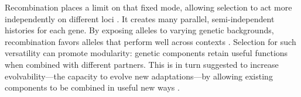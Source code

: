 \documentclass[11pt]{article}
\begin{document}
Recombination places a limit on that fixed mode, allowing selection to act more independently on different loci \citep{felsenstein1974evolutionary}. It creates many parallel, semi-independent histories for each gene. By exposing alleles to varying genetic backgrounds, recombination favors alleles that perform well across contexts \citep{livnat2008mixability,livnat2010sex}. Selection for such versatility can promote modularity: genetic components retain useful functions when combined with different partners. This is in turn suggested to increase evolvability---the capacity to evolve new adaptations---by allowing existing components to be combined in useful new ways \citep{wagner1996perspective,watson2016can,watson2016connectionism,masel2010robustness}. 













\end{document}
